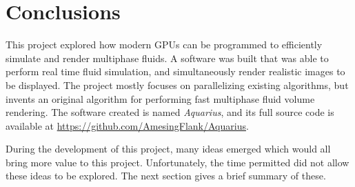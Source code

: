 \chapter{Conclusions}
\label{chapter conclusions}

This project explored how modern GPUs can be programmed to efficiently simulate and render multiphase fluids. A software was built that was able to perform real time fluid simulation, and simultaneously render realistic images to be displayed. The project mostly focuses on parallelizing existing algorithms, but invents an original algorithm for performing fast multiphase fluid volume rendering. The software created is named \textit{Aquarius}, and its full source code is available at \url{https://github.com/AmesingFlank/Aquarius}.

During the development of this project, many ideas emerged which would all bring more value to this project. Unfortunately, the time permitted did not allow these ideas to be explored. The next section gives a brief summary of these.

